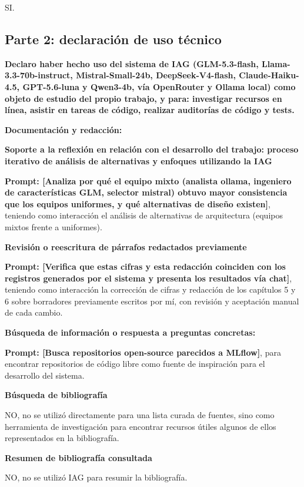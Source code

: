 SI.

\subsection*{Parte 2: declaración de uso técnico}

\textbf{Declaro haber hecho uso del sistema de IAG (GLM-5.3-flash, Llama-3.3-70b-instruct, Mistral-Small-24b, DeepSeek-V4-flash, Claude-Haiku-4.5, GPT-5.6-luna y Qwen3-4b, vía OpenRouter y Ollama local) como objeto de estudio del propio trabajo, y para: investigar recursos en línea, asistir en tareas de código, realizar auditorías de código y tests.}

\textbf{Documentación y redacción:}

\textbf{Soporte a la reflexión en relación con el desarrollo del trabajo: proceso iterativo de análisis de alternativas y enfoques utilizando la IAG}

\textbf{Prompt: [Analiza por qué el equipo mixto (analista ollama, ingeniero de características GLM, selector mistral) obtuvo mayor consistencia que los equipos uniformes, y qué alternativas de diseño existen]}, teniendo como interacción el análisis de alternativas de arquitectura (equipos mixtos frente a uniformes).

\textbf{Revisión o reescritura de párrafos redactados previamente}

\textbf{Prompt: [Verifica que estas cifras y esta redacción coinciden con los registros generados por el sistema y presenta los resultados vía chat]}, teniendo como interacción la corrección de cifras y redacción de los capítulos 5 y 6 sobre borradores previamente escritos por mí, con revisión y aceptación manual de cada cambio.

\textbf{Búsqueda de información o respuesta a preguntas concretas:}

\textbf{Prompt: [Busca repositorios open-source parecidos a MLflow]}, para encontrar repositorios de código libre como fuente de inspiración para el desarrollo del sistema.

\textbf{Búsqueda de bibliografía}

NO, no se utilizó directamente para una lista curada de fuentes, sino como herramienta de investigación para encontrar recursos útiles algunos de ellos representados en la bibliografía.

\textbf{Resumen de bibliografía consultada}

NO, no se utilizó IAG para resumir la bibliografía.

